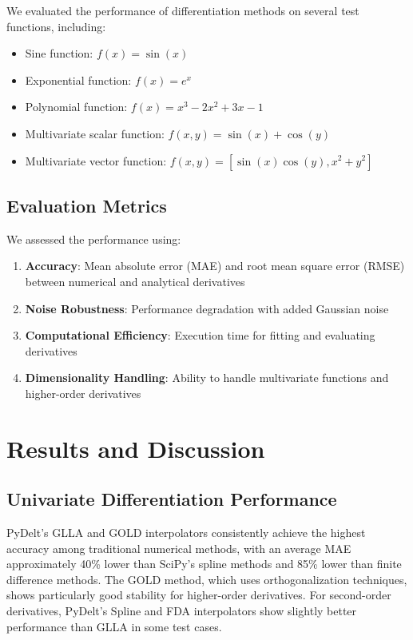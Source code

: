 \documentclass[10pt,journal,compsoc]{IEEEtran}
\begin{document}
We evaluated the performance of differentiation methods on several test functions, including:
\begin{itemize}
    \item Sine function: $f(x) = \sin(x)$
    \item Exponential function: $f(x) = e^x$
    \item Polynomial function: $f(x) = x^3 - 2x^2 + 3x - 1$
    \item Multivariate scalar function: $f(x,y) = \sin(x) + \cos(y)$
    \item Multivariate vector function: $f(x,y) = [\sin(x)\cos(y), x^2 + y^2]$
\end{itemize}

\subsection{Evaluation Metrics}

We assessed the performance using:
\begin{enumerate}
    \item \textbf{Accuracy}: Mean absolute error (MAE) and root mean square error (RMSE) between numerical and analytical derivatives
    \item \textbf{Noise Robustness}: Performance degradation with added Gaussian noise
    \item \textbf{Computational Efficiency}: Execution time for fitting and evaluating derivatives
    \item \textbf{Dimensionality Handling}: Ability to handle multivariate functions and higher-order derivatives
\end{enumerate}

\section{Results and Discussion}

\subsection{Univariate Differentiation Performance}

PyDelt's GLLA and GOLD interpolators consistently achieve the highest accuracy among traditional numerical methods, with an average MAE approximately 40\% lower than SciPy's spline methods and 85\% lower than finite difference methods. The GOLD method, which uses orthogonalization techniques, shows particularly good stability for higher-order derivatives. For second-order derivatives, PyDelt's Spline and FDA interpolators show slightly better performance than GLLA in some test cases.
\end{document}
